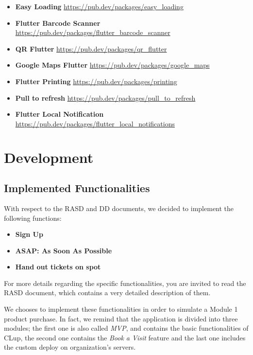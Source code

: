\documentclass[table, 12pt]{article}
\begin{document}
\begin{itemize}
    \item \textbf{Easy Loading} \href{https://pub.dev/packages/easy_loading}{https://pub.dev/packages/easy\_loading}
    \item \textbf{Flutter Barcode Scanner} \href{https://pub.dev/packages/flutter_barcode_scanner}{https://pub.dev/packages/flutter\_barcode\_scanner}
    \item \textbf{QR Flutter} \href{https://pub.dev/packages/qr_flutter}{https://pub.dev/packages/qr\_flutter}
    \item \textbf{Google Maps Flutter} \href{https://pub.dev/packages/google_maps}{https://pub.dev/packages/google\_maps}
    \item \textbf{Flutter Printing} \href{https://pub.dev/packages/printing}{https://pub.dev/packages/printing}
    \item \textbf{Pull to refresh} \href{https://pub.dev/packages/pull_to_refresh}{https://pub.dev/packages/pull\_to\_refresh}
    \item \textbf{Flutter Local Notification} \href{https://pub.dev/packages/flutter_local_notifications}{https://pub.dev/packages/flutter\_local\_notifications}
\end{itemize}

\newpage
\section{Development}
\subsection{Implemented Functionalities}
With respect to the RASD and DD documents, we decided to implement the following functions:
\begin{itemize}
    \item \textbf{Sign Up}
    \item \textbf{ASAP: As Soon As Possible}
    \item \textbf{Hand out tickets on spot}
\end{itemize}
For more details regarding the specific functionalities, you are invited to read the RASD document, which contains a very detailed description of them.

We chooses to implement these functionalities in order to simulate a Module 1 product purchase. In fact, we remind that the application is divided into three modules; the first one is also called \textit{MVP}, and contains the basic functionalities of CLup, the second one contains the \textit{Book a Visit} feature and the last one includes the custom deploy on organization's servers.
\end{document}
